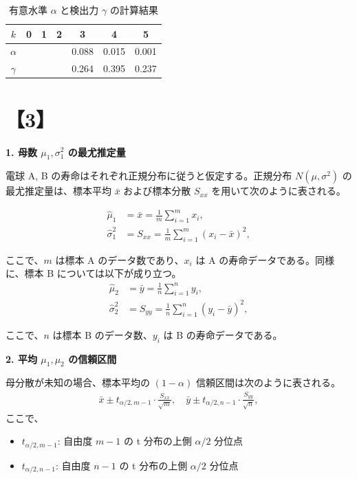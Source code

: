 \documentclass[10pt]{jsarticle}
\begin{document}
\begin{table}[h]
    \centering
    \begin{tabular}{|c|c|c|c|c|c|c|}
    \hline
    \(k\) & 0 & 1 & 2 & 3 & 4 & 5 \\
    \hline
    \(\alpha\) & \multicolumn{3}{c|}{} & 0.088 & 0.015 & 0.001 \\
    \hline
    \(\gamma\) & \multicolumn{3}{c|}{} & 0.264 & 0.395 & 0.237 \\
    \hline
    \end{tabular}
    \caption{有意水準 \(\alpha\) と検出力 \(\gamma\) の計算結果}
\end{table}

\bigskip
\bigskip

\section*{【3】}

{\bf 1. 母数 \(\mu_1, \sigma_1^2\) の最尤推定量}

電球 A, B の寿命はそれぞれ正規分布に従うと仮定する。正規分布 \(N(\mu, \sigma^2)\) の最尤推定量は、標本平均 \(\bar{x}\) および標本分散 \(S_{xx}\) を用いて次のように表される。

\begin{align*}
    \hat{\mu}_1 &= \bar{x} = \frac{1}{m} \sum_{i=1}^m x_i, \\
    \hat{\sigma}_1^2 &= S_{xx} = \frac{1}{m} \sum_{i=1}^m (x_i - \bar{x})^2,
\end{align*}

ここで、\(m\) は標本 A のデータ数であり、\(x_i\) は A の寿命データである。同様に、標本 B については以下が成り立つ。
\begin{align*}
    \hat{\mu}_2 &= \bar{y} = \frac{1}{n} \sum_{i=1}^n y_i, \\
    \hat{\sigma}_2^2 &= S_{yy} = \frac{1}{n} \sum_{i=1}^n (y_i - \bar{y})^2,
\end{align*}

ここで、\(n\) は標本 B のデータ数、\(y_i\) は B の寿命データである。

{\bf 2. 平均 \(\mu_1, \mu_2\) の信頼区間}

母分散が未知の場合、標本平均の \((1 - \alpha)\) 信頼区間は次のように表される。
\begin{align*}
    \bar{x} \pm t_{\alpha/2, m-1} \cdot \frac{S_{xx}}{\sqrt{m}}, \quad \bar{y} \pm t_{\alpha/2, n-1} \cdot \frac{S_{yy}}{\sqrt{n}},
\end{align*}
ここで、
\begin{itemize}
    \item \(t_{\alpha/2, m-1}\): 自由度 \(m-1\) の t 分布の上側 \(\alpha/2\) 分位点
    \item \(t_{\alpha/2, n-1}\): 自由度 \(n-1\) の t 分布の上側 \(\alpha/2\) 分位点
\end{itemize}
\end{document}
